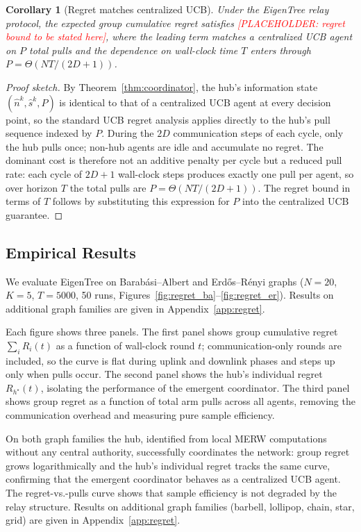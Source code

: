 \documentclass{article}
\newtheorem{corollary}{Corollary}
\newcommand{\merw}{EigenTree}
\begin{document}
\begin{corollary}[Regret matches centralized UCB]
\label{cor:regret}
Under the \merw{} relay protocol, the expected group cumulative regret satisfies \textcolor{red}{[PLACEHOLDER: regret bound to be stated here]}, where the leading term matches a centralized UCB agent on $P$ total pulls and the dependence on wall-clock time $T$ enters through $P = \Theta(NT/(2D+1))$.
\end{corollary}

\begin{proof}[Proof sketch]
By Theorem~\ref{thm:coordinator}, the hub's information state $(\hat{n}^k, \hat{s}^k, P)$ is identical to that of a centralized UCB agent at every decision point, so the standard UCB regret analysis applies directly to the hub's pull sequence indexed by $P$. During the $2D$ communication steps of each cycle, only the hub pulls once; non-hub agents are idle and accumulate no regret. The dominant cost is therefore not an additive penalty per cycle but a reduced pull rate: each cycle of $2D+1$ wall-clock steps produces exactly one pull per agent, so over horizon $T$ the total pulls are $P = \Theta(NT/(2D+1))$. The regret bound in terms of $T$ follows by substituting this expression for $P$ into the centralized UCB guarantee.
\end{proof}

\subsection{Empirical Results}

We evaluate \merw{} on Barab\'{a}si--Albert and Erd\H{o}s--R\'{e}nyi graphs ($N=20$, $K=5$, $T=5000$, 50 runs, Figures~\ref{fig:regret_ba}--\ref{fig:regret_er}). Results on additional graph families are given in Appendix~\ref{app:regret}.

Each figure shows three panels. The first panel shows group cumulative regret $\sum_i R_i(t)$ as a function of wall-clock round $t$; communication-only rounds are included, so the curve is flat during uplink and downlink phases and steps up only when pulls occur. The second panel shows the hub's individual regret $R_{h^\star}(t)$, isolating the performance of the emergent coordinator. The third panel shows group regret as a function of total arm pulls across all agents, removing the communication overhead and measuring pure sample efficiency.

On both graph families the hub, identified from local MERW computations without any central authority, successfully coordinates the network: group regret grows logarithmically and the hub's individual regret tracks the same curve, confirming that the emergent coordinator behaves as a centralized UCB agent. The regret-vs.-pulls curve shows that sample efficiency is not degraded by the relay structure. Results on additional graph families (barbell, lollipop, chain, star, grid) are given in Appendix~\ref{app:regret}.
\end{document}
